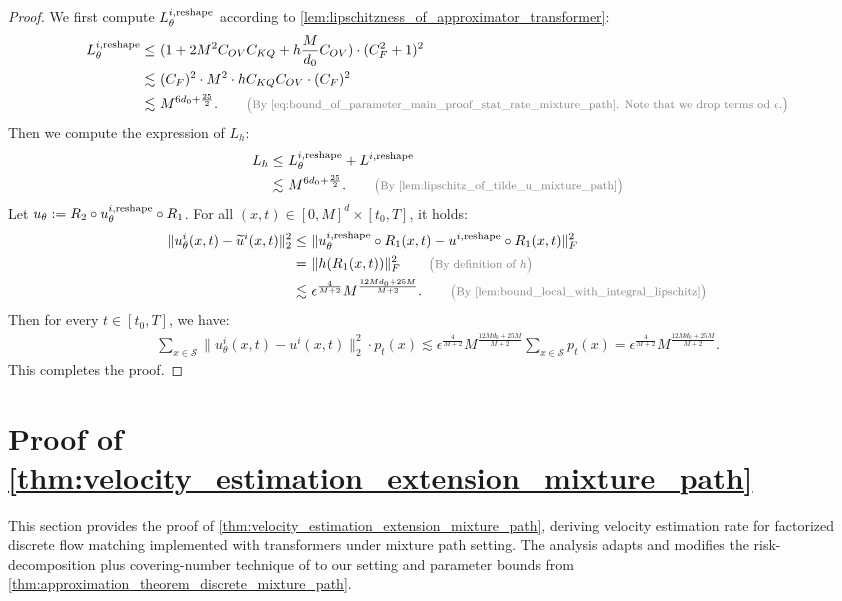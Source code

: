 \documentclass[12pt]{article}
\numberwithin{equation}{section}
\let\tilde\widetilde
\newcommand{\wt}{\widetilde}
\renewcommand{\tilde}{\wt}
\let\cite\citep
\theoremstyle{theoremstyle}
\numberwithin{equation}{section}
\numberwithin{theorem}{section}
\numberwithin{proposition}{section}
\numberwithin{definition}{section}
\numberwithin{lemma}{section}
\numberwithin{assumption}{section}
\numberwithin{remark}{section}
\newcommand*{\annot}[1]{\tag*{\footnotesize{\textcolor{black!50}{\big(#1\big)}}}}
\begin{document}
\begin{proof}
We first compute $L_\theta^{i, \rm reshape}$ according to \cref{lem:lipschitzness_of_approximator_transformer}:
\begin{align*}
    L_\theta^{i, \rm reshape}\leq & ~
    (1+2M^2C_{OV}C_{KQ}+h\frac{M}{d_0}C_{OV})\cdot(C_F^2+1)^2\\
    \lesssim & ~
    (C_F)^2\cdot M^2\cdot h C_{KQ}C_{OV}\cdot(C_F)^2 \\
    \lesssim & ~
    M^{6d_0+\frac{25}{2}}. \annot{By \eqref{eq:bound_of_parameter_main_proof_stat_rate_mixture_path}. Note that we drop terms od $\epsilon$.}
\end{align*}
Then we compute the expression of $L_h$:
\begin{align*}
    L_h\leq & ~
    L_\theta^{i, \rm reshape}+L^{i, \rm reshape}\\
    \lesssim & ~
    M^{6d_0+\frac{25}{2}}.  \annot{By \cref{lem:lipschitz_of_tilde_u_mixture_path}}
\end{align*}
Let $u_\theta:=R_2\circ u_\theta^{i, \rm reshape}\circ R_1$.
For all $(x,t)\in[0,M]^d\times[t_0,T]$, it holds:
\begin{align*}
    \|u^i_\theta(x,t)-\tilde{u}^i(x,t)\|^2_2\leq & ~
    \|u_\theta^{i, \rm reshape}\circ R_1(x,t)-u^{i, \rm reshape}\circ R_1(x,t)\|^2_F \\
    = & ~
    \|h(R_1(x,t))\|^2_F 
    \annot{By definition of $h$}\\
    \lesssim & ~
    \epsilon^\frac{4}{M+2}M^{\frac{12Md_0+25M}{M+2}}.\annot{By \cref{lem:bound_local_with_integral_lipschitz}}
\end{align*}
Then for every $t\in[t_0,T]$, we have:
\begin{align*}
    \sum_{x\in \mathcal{S}}\|u^i_\theta(x,t)-u^i(x,t)\|^2_2\cdot p_t(x) \lesssim  
    \epsilon^\frac{4}{M+2}M^{\frac{12Md_0+25M}{M+2}} \sum_{x\in \mathcal{S}}p_t(x)=\epsilon^\frac{4}{M+2}M^{\frac{12Md_0+25M}{M+2}}.
\end{align*}
This completes the proof.
 \end{proof}

\clearpage


\section{\texorpdfstring{Proof of \cref{thm:velocity_estimation_extension_mixture_path}}{Proof of Theorem \ref{thm:velocity_estimation_extension_mixture_path}}}
\label{sec:proof_dfm_velocity_esti_mp}


This section provides the proof of \cref{thm:velocity_estimation_extension_mixture_path}, deriving velocity estimation rate for factorized discrete flow matching implemented with transformers under mixture path setting. 
The analysis adapts and modifies the risk-decomposition plus covering-number technique of \cite{fu2024unveil} to our setting and parameter bounds from \cref{thm:approximation_theorem_discrete_mixture_path}.
\end{document}
